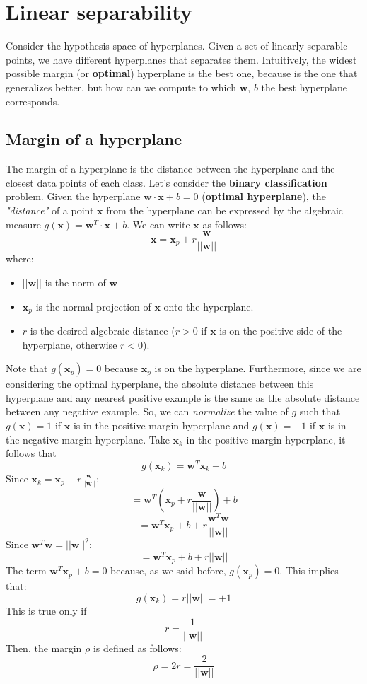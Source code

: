 \section{Linear separability}
Consider the hypothesis space of hyperplanes. Given a set of linearly separable points, we have different hyperplanes that separates them. Intuitively, the widest possible margin (or \textbf{optimal}) hyperplane is the best one, because is the one that generalizes better, but how can we compute to which $\textbf{w}$, $b$ the best hyperplane corresponds.
\subsection{Margin of a hyperplane}
The margin of a hyperplane is the distance between the hyperplane and the closest data points of each class. \newline\newline
Let's consider the \textbf{binary classification} problem. Given the hyperplane $\textbf{w} \cdot \textbf{x} + b = 0$ (\textbf{optimal hyperplane}), the \textit{"distance"} of a point $\textbf{x}$ from the hyperplane can be expressed by the algebraic measure $g(\textbf{x}) = \textbf{w}^{T} \cdot \textbf{x} + b$. We can write $\textbf{x}$ as follows:
\[\textbf{x} = \textbf{x}_{p} + r\frac{\textbf{w}}{||\textbf{w}||}\]
where:
\begin{itemize}
    \item $||\textbf{w}||$ is the norm of $\textbf{w}$
    \item $\textbf{x}_{p}$ is the normal projection of $\textbf{x}$ onto the hyperplane.
    \item $r$ is the desired algebraic distance ($r > 0$ if $\textbf{x}$ is on the positive side of the hyperplane, otherwise $r < 0$).
\end{itemize}
Note that $g(\textbf{x}_{p}) = 0$ because $\textbf{x}_{p}$ is on the hyperplane. Furthermore, since we are considering the optimal hyperplane, the absolute distance between this hyperplane and any nearest positive example is the same as the absolute distance between any negative example. So, we can \textit{normalize} the value of $g$ such that $g(\textbf{x}) = 1$ if $\textbf{x}$ is in the positive margin hyperplane and $g(\textbf{x}) = -1$ if $\textbf{x}$ is in the negative margin hyperplane.\newline\newline
Take $\textbf{x}_{k}$ in the positive margin hyperplane, it follows that
\[g(\textbf{x}_{k}) = \textbf{w}^{T}\textbf{x}_{k} + b\]
Since $\textbf{x}_{k} = \textbf{x}_{p} + r\frac{\textbf{w}}{||\textbf{w}||}$:
\[= \textbf{w}^{T}\left(\textbf{x}_{p} + r\frac{\textbf{w}}{||\textbf{w}||}\right) + b\]
\[= \textbf{w}^{T}\textbf{x}_{p} + b + r\frac{\textbf{w}^{T}\textbf{w}}{||\textbf{w}||}\]
Since $\textbf{w}^{T}\textbf{w} = ||\textbf{w}||^{2}$:
\[= \textbf{w}^{T}\textbf{x}_{p} + b + r||\textbf{w}||\]
The term $\textbf{w}^{T}\textbf{x}_{p} + b = 0$ because, as we said before, $g(\textbf{x}_{p}) = 0$. This implies that:
\[g(\textbf{x}_{k}) = r||\textbf{w}|| = +1\]
This is true only if
\[r = \frac{1}{||\textbf{w}||}\]
Then, the margin $\rho$ is defined as follows:
\[\rho = 2r = \frac{2}{||\textbf{w}||}\]
